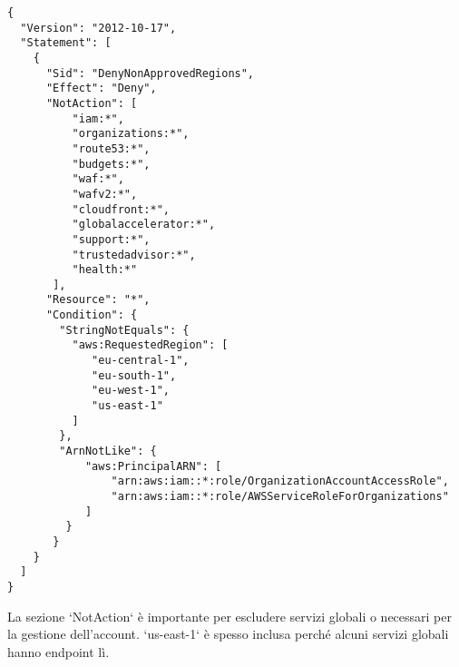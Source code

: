 \begin{itemize}
    \begin{lstlisting}[style=json, caption={SCP per limitare le regioni AWS utilizzabili}, label=lst:scp-region-restriction-iam]
{
  "Version": "2012-10-17",
  "Statement": [
    {
      "Sid": "DenyNonApprovedRegions",
      "Effect": "Deny",
      "NotAction": [ 
          "iam:*",
          "organizations:*",
          "route53:*",
          "budgets:*",
          "waf:*",
          "wafv2:*",
          "cloudfront:*",
          "globalaccelerator:*",
          "support:*",
          "trustedadvisor:*", 
          "health:*" 
       ],
      "Resource": "*",
      "Condition": {
        "StringNotEquals": {
          "aws:RequestedRegion": [
             "eu-central-1",
             "eu-south-1",
             "eu-west-1",
             "us-east-1" 
          ]
        },
        "ArnNotLike": { 
            "aws:PrincipalARN": [
                "arn:aws:iam::*:role/OrganizationAccountAccessRole", 
                "arn:aws:iam::*:role/AWSServiceRoleForOrganizations" 
            ]
         }
       }
    }
  ]
}
    \end{lstlisting}
    La sezione `NotAction` è importante per escludere servizi globali o necessari per la gestione dell'account. `us-east-1` è spesso inclusa perché alcuni servizi globali hanno endpoint lì.
\end{itemize}

